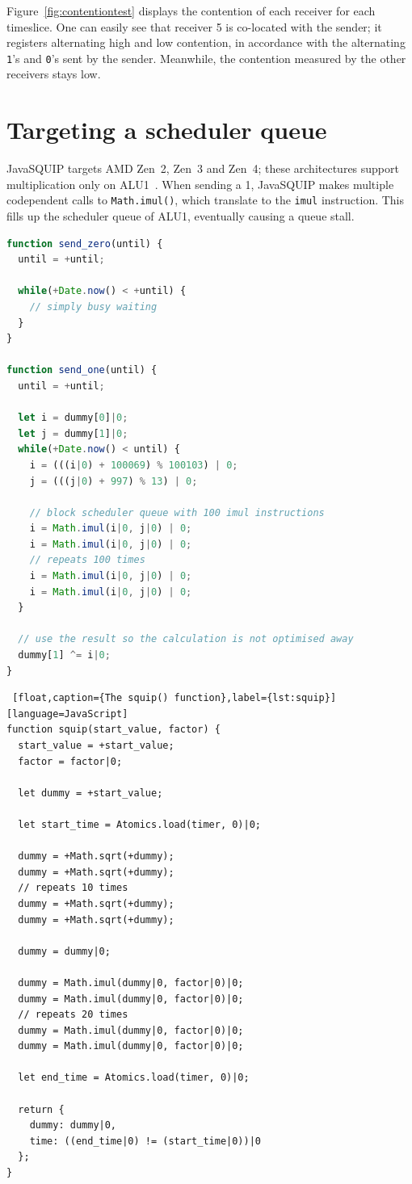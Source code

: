 \documentclass[11pt,
  titlepage=false,
  parskip=half,      %
]{scrreprt}
\begin{document}
Figure~\ref{fig:contentiontest} displays the contention of each receiver for each timeslice.
One can easily see that receiver 5 is co-located with the sender;
it registers alternating high and low contention, in accordance with the alternating \texttt{1}'s and \texttt{0}'s sent by the sender.
Meanwhile, the contention measured by the other receivers stays low.

\section{Targeting a scheduler queue}
JavaSQUIP targets AMD Zen~2, Zen~3 and Zen~4;
these architectures support multiplication only on ALU1~\cite{AMD2020OptimizationEPYC7003}.
When sending a 1, JavaSQUIP makes multiple codependent calls to \texttt{Math.imul()}, which translate to the \texttt{imul} instruction.
This fills up the scheduler queue of ALU1, eventually causing a queue stall.

\begin{lstlisting}[float,caption={The functions \texttt{send\_zero()} and \texttt{send\_one()}},label={lst:sendzeroone},language=JavaScript]
function send_zero(until) {
  until = +until;

  while(+Date.now() < +until) {
    // simply busy waiting
  }
}

function send_one(until) {
  until = +until;

  let i = dummy[0]|0;
  let j = dummy[1]|0;
  while(+Date.now() < until) {
    i = (((i|0) + 100069) % 100103) | 0;
    j = (((j|0) + 997) % 13) | 0;

    // block scheduler queue with 100 imul instructions
    i = Math.imul(i|0, j|0) | 0;
    i = Math.imul(i|0, j|0) | 0;
    // repeats 100 times
    i = Math.imul(i|0, j|0) | 0;
    i = Math.imul(i|0, j|0) | 0;
  }

  // use the result so the calculation is not optimised away
  dummy[1] ^= i|0;
}
\end{lstlisting}

\begin{lstlisting} [float,caption={The squip() function},label={lst:squip}][language=JavaScript]
function squip(start_value, factor) {
  start_value = +start_value;
  factor = factor|0;

  let dummy = +start_value;

  let start_time = Atomics.load(timer, 0)|0;

  dummy = +Math.sqrt(+dummy);
  dummy = +Math.sqrt(+dummy);
  // repeats 10 times
  dummy = +Math.sqrt(+dummy);
  dummy = +Math.sqrt(+dummy);

  dummy = dummy|0;

  dummy = Math.imul(dummy|0, factor|0)|0;
  dummy = Math.imul(dummy|0, factor|0)|0;
  // repeats 20 times
  dummy = Math.imul(dummy|0, factor|0)|0;
  dummy = Math.imul(dummy|0, factor|0)|0;

  let end_time = Atomics.load(timer, 0)|0;

  return {
    dummy: dummy|0,
    time: ((end_time|0) != (start_time|0))|0
  };
}
\end{lstlisting}
\end{document}
